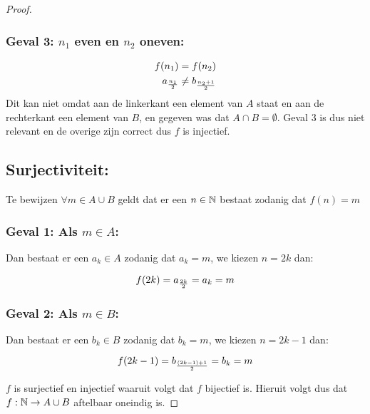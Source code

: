 \documentclass{article}
\begin{document}
\begin{proof}
    \subsubsection*{Geval 3: $n_1$ even en $n_2$ oneven:}
    \begin{align*}
        f(n_1)         & = f(n_2)              \\
        a_{\frac{n_1}{2}} & \neq b_{\frac{n_2+1}{2}} \\
    \end{align*}
    Dit kan niet omdat aan de linkerkant
    een element van $A$ staat en aan de rechterkant
    een element van $B$, en gegeven was dat $A \cap B = \emptyset$.
    Geval 3 is dus niet relevant en de overige zijn correct dus
    $f$ is injectief.

    \subsection*{Surjectiviteit:}
    Te bewijzen $\forall m \in A \cup B$ geldt dat er een $n \in \mathbb{N}$ bestaat zodanig
    dat $f(n) = m$
    \subsubsection*{Geval 1: Als $m \in A$:}
    Dan bestaat er een $a_k \in A$ zodanig dat $a_k = m$, we kiezen $n = 2k$ dan:

    \[f(2k) = a_{\frac{2k}{2}} = a_k = m\]

    \subsubsection*{Geval 2: Als $m \in B$:}
    Dan bestaat er een $b_k \in B$ zodanig dat $b_k = m$, we kiezen $n = 2k-1$ dan:

    \[f(2k-1) = b_{\frac{(2k-1) + 1}{2}} = b_k = m\]

    $f$ is surjectief en injectief waaruit volgt dat $f$ bijectief is.
    Hieruit volgt dus dat $f: \mathbb{N} \rightarrow A \cup B$ aftelbaar oneindig is.

\end{proof}
\end{document}
